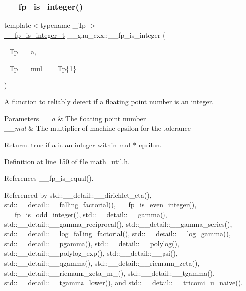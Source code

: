 \subsubsection{\texorpdfstring{\+\_\+\+\_\+fp\+\_\+is\+\_\+integer()}{\_\_fp\_is\_integer()}}
{\footnotesize\ttfamily template$<$typename \+\_\+\+Tp $>$ \\
\hyperlink{struct____gnu__cxx_1_1____fp__is__integer__t}{\+\_\+\+\_\+fp\+\_\+is\+\_\+integer\+\_\+t} \+\_\+\+\_\+gnu\+\_\+cxx\+::\+\_\+\+\_\+fp\+\_\+is\+\_\+integer (\begin{DoxyParamCaption}\item[{\+\_\+\+Tp}]{\+\_\+\+\_\+a,  }\item[{\+\_\+\+Tp}]{\+\_\+\+\_\+mul = {\ttfamily \+\_\+Tp\{1\}} }\end{DoxyParamCaption})\hspace{0.3cm}{\ttfamily [inline]}}

A function to reliably detect if a floating point number is an integer.


\begin{DoxyParams}{Parameters}
{\em \+\_\+\+\_\+a} & The floating point number \\
\hline
{\em \+\_\+\+\_\+mul} & The multiplier of machine epsilon for the tolerance \\
\hline
\end{DoxyParams}
\begin{DoxyReturn}{Returns}
{\ttfamily true} if a is an integer within mul $\ast$ epsilon. 
\end{DoxyReturn}


Definition at line 150 of file math\+\_\+util.\+h.



References \+\_\+\+\_\+fp\+\_\+is\+\_\+equal().



Referenced by std\+::\+\_\+\+\_\+detail\+::\+\_\+\+\_\+dirichlet\+\_\+eta(), std\+::\+\_\+\+\_\+detail\+::\+\_\+\+\_\+falling\+\_\+factorial(), \+\_\+\+\_\+fp\+\_\+is\+\_\+even\+\_\+integer(), \+\_\+\+\_\+fp\+\_\+is\+\_\+odd\+\_\+integer(), std\+::\+\_\+\+\_\+detail\+::\+\_\+\+\_\+gamma(), std\+::\+\_\+\+\_\+detail\+::\+\_\+\+\_\+gamma\+\_\+reciprocal(), std\+::\+\_\+\+\_\+detail\+::\+\_\+\+\_\+gamma\+\_\+series(), std\+::\+\_\+\+\_\+detail\+::\+\_\+\+\_\+log\+\_\+falling\+\_\+factorial(), std\+::\+\_\+\+\_\+detail\+::\+\_\+\+\_\+log\+\_\+gamma(), std\+::\+\_\+\+\_\+detail\+::\+\_\+\+\_\+pgamma(), std\+::\+\_\+\+\_\+detail\+::\+\_\+\+\_\+polylog(), std\+::\+\_\+\+\_\+detail\+::\+\_\+\+\_\+polylog\+\_\+exp(), std\+::\+\_\+\+\_\+detail\+::\+\_\+\+\_\+psi(), std\+::\+\_\+\+\_\+detail\+::\+\_\+\+\_\+qgamma(), std\+::\+\_\+\+\_\+detail\+::\+\_\+\+\_\+riemann\+\_\+zeta(), std\+::\+\_\+\+\_\+detail\+::\+\_\+\+\_\+riemann\+\_\+zeta\+\_\+m\+\_(), std\+::\+\_\+\+\_\+detail\+::\+\_\+\+\_\+tgamma(), std\+::\+\_\+\+\_\+detail\+::\+\_\+\+\_\+tgamma\+\_\+lower(), and std\+::\+\_\+\+\_\+detail\+::\+\_\+\+\_\+tricomi\+\_\+u\+\_\+naive().

